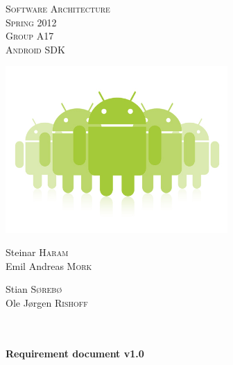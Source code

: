\begin{titlepage}

\begin{center}

\textsc{\LARGE Software Architecture}\\[1.0cm]

\textsc{\Large Spring 2012}\\[1.0cm]

\textsc{Group A17} \\
\textsc{Android SDK}

\includegraphics[width=240pt]{./androids}\\[0.5cm]   

\begin{minipage}{0.4\textwidth}
\begin{flushleft} \large
Steinar \textsc{Haram}\\
Emil Andreas \textsc{Mork}\\

\end{flushleft}
\end{minipage}
\begin{minipage}{0.4\textwidth}
\begin{flushright} \large
Stian \textsc{Sørebø}\\
Ole Jørgen \textsc{Rishoff}
\end{flushright}
\end{minipage}\\[1.0cm]



\HRule \\[0.4cm]
{ \huge \bfseries Requirement document v1.0}\\[0.4cm]

\HRule \\[1.5cm]


\end{center}
\end{titlepage}
